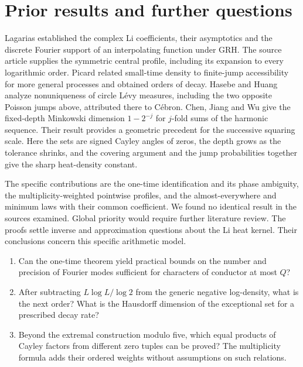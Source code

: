 \documentclass[11pt,letterpaper]{article}
\theoremstyle{plain}
\theoremstyle{definition}\newtheorem{example}[theorem]{Example}
\begin{document}
\section{Prior results and further questions}
Lagarias \cite{lagarias} established the complex Li coefficients, their asymptotics and the discrete Fourier support of an interpolating function under GRH. The source article \cite{article} supplies the symmetric central profile, including its expansion to every logarithmic order. Picard \cite{picard,picard2} related small-time density to finite-jump accessibility for more general processes and obtained orders of decay. Hasebe and Huang \cite{huang} analyze nonuniqueness of circle L\'evy measures, including the two opposite Poisson jumps above, attributed there to C\'ebron. Chen, Jiang and Wu \cite{chen} give the fixed-depth Minkowski dimension $1-2^{-j}$ for $j$-fold sums of the harmonic sequence. Their result provides a geometric precedent for the successive squaring scale. Here the sets are signed Cayley angles of zeros, the depth grows as the tolerance shrinks, and the covering argument and the jump probabilities together give the sharp heat-density constant.

The specific contributions are the one-time identification and its phase ambiguity, the multiplicity-weighted pointwise profiles, and the almost-everywhere and minimum laws with their common coefficient. We found no identical result in the sources examined. Global priority would require further literature review. The proofs settle inverse and approximation questions about the Li heat kernel. Their conclusions concern this specific arithmetic model.

\begin{enumerate}[leftmargin=*,label=\arabic*.]
\item Can the one-time theorem yield practical bounds on the number and precision of Fourier modes sufficient for characters of conductor at most $Q$?
\item After subtracting $L\log L/\log2$ from the generic negative log-density, what is the next order? What is the Hausdorff dimension of the exceptional set for a prescribed decay rate?
\item Beyond the extremal construction modulo five, which equal products of Cayley factors from different zero tuples can be proved? The multiplicity formula adds their ordered weights without assumptions on such relations.
\end{enumerate}
\end{document}
